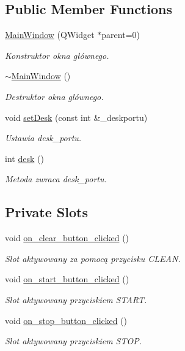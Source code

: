 \subsection*{Public Member Functions}
\begin{DoxyCompactItemize}
\item 
\hyperlink{class_main_window_a8b244be8b7b7db1b08de2a2acb9409db}{Main\+Window} (Q\+Widget $\ast$parent=0)
\begin{DoxyCompactList}\small\item\em Konstruktor okna głównego. \end{DoxyCompactList}\item 
\hyperlink{class_main_window_ae98d00a93bc118200eeef9f9bba1dba7}{$\sim$\+Main\+Window} ()
\begin{DoxyCompactList}\small\item\em Destruktor okna glównego. \end{DoxyCompactList}\item 
void \hyperlink{class_main_window_a78eb93451b676752f966dc2f45c7a2a1}{set\+Desk} (const int \&\+\_\+deskportu)
\begin{DoxyCompactList}\small\item\em Ustawia desk\+\_\+portu. \end{DoxyCompactList}\item 
int \hyperlink{class_main_window_ad000e48bacc14dccf59231bb30b046ac}{desk} ()
\begin{DoxyCompactList}\small\item\em Metoda zwraca desk\+\_\+portu. \end{DoxyCompactList}\end{DoxyCompactItemize}
\subsection*{Private Slots}
\begin{DoxyCompactItemize}
\item 
void \hyperlink{class_main_window_a2646490b51f2dc402814167e5bd0dae7}{on\+\_\+clear\+\_\+button\+\_\+clicked} ()
\begin{DoxyCompactList}\small\item\em Slot aktywowany za pomocą przycisku C\+L\+E\+AN. \end{DoxyCompactList}\item 
void \hyperlink{class_main_window_a0a3e23defe2393514e469e45aa13b756}{on\+\_\+start\+\_\+button\+\_\+clicked} ()
\begin{DoxyCompactList}\small\item\em Slot aktywowany przyciskiem S\+T\+A\+RT. \end{DoxyCompactList}\item 
void \hyperlink{class_main_window_a432e89bd5ab9691e8fc3ba91a9b9129a}{on\+\_\+stop\+\_\+button\+\_\+clicked} ()
\begin{DoxyCompactList}\small\item\em Slot aktywowany przyciskiem S\+T\+OP. \end{DoxyCompactList}\end{DoxyCompactItemize}
